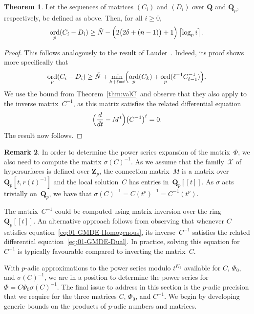 \documentclass[a4paper,11pt]{article}
\numberwithin{equation}{section}
\providecommand{\ceil}[1]{\left\lceil#1\right\rceil}   %
\DeclareMathOperator{\ord}{ord}          %
\theoremstyle{definition}
\newtheorem{thm}{Theorem}[section]
\newtheorem{rem}[thm]{Remark}
\begin{document}
\begin{thm}
Let the sequences of matrices $(C_i)$ and $(D_i)$ over $\mathbf{Q}$ and 
$\mathbf{Q}_p$, respectively, be defined as above.  Then, for all $i \geq 0$, 
\begin{equation*}
\ord_p(C_i - D_i) \geq 
    \tilde{N} - \Bigl(2 \bigl(2 \delta + (n-1)\bigr) + 1\Bigr) \ceil{\log_p i}.
\end{equation*}
\end{thm}

\begin{proof}
This follows analogously to the result of 
Lauder~\citep[Theorem~5.1]{Lauder2006}.  
Indeed, its proof shows more specifically that 
\begin{equation}
\ord_p(C_i - D_i) \geq 
    \tilde{N} + \min_{k+\ell=i} \Bigl(\ord_p(C_k) + 
                                      \ord_p(\ell^{-1} C_{\ell-1}^{-1})\Bigr).
\end{equation}
We use the bound from Theorem~\ref{thm:valC} and observe that they 
also apply to the inverse matrix~$C^{-1}$, as this matrix satisfies 
the related differential equation 
\begin{equation} \label{eq:01-GMDE-Dual}
\Bigl(\frac{d}{dt} - M^t\Bigr) \bigl(C^{-1}\bigr)^t = 0.
\end{equation}
The result now follows.
\end{proof}

\begin{rem}
In order to determine the power series expansion of the matrix~$\Phi$, 
we also need to compute the matrix $\sigma(C)^{-1}$.  As we assume that 
the family~$\mathcal{X}$ of hypersurfaces is defined over $\mathbf{Z}_p$, 
the connection matrix~$M$ is a matrix over $\mathbf{Q}_p[t,r(t)^{-1}]$ 
and the local solution~$C$ has entries in~$\mathbf{Q}_p[[t]]$.  
As $\sigma$ acts trivially on~$\mathbf{Q}_p$, we have that 
$\sigma(C)^{-1} = C(t^p)^{-1} = C^{-1}(t^p)$. 

The matrix~$C^{-1}$ could be computed using matrix inversion 
over the ring $\mathbf{Q}_p[[t]]$.  An alternative approach 
follows from observing that whenever $C$ satisfies 
equation~\eqref{eq:01-GMDE-Homogenous}, its inverse~$C^{-1}$ 
satisfies the related differential equation~\eqref{eq:01-GMDE-Dual}. 
In practice, solving this equation for $C^{-1}$ is typically favourable 
compared to inverting the matrix~$C$.
\end{rem}

With $p$-adic approximations to the power series modulo $t^{K_2}$ available 
for $C$, $\Phi_0$, and $\sigma(C)^{-1}$, we are in a position to determine 
the power series for $\Phi = C \Phi_0 \sigma(C)^{-1}$.  The final issue 
to address in this section is the $p$-adic precision that we require for 
the three matrices $C$, $\Phi_0$, and $C^{-1}$.
We begin by developing generic bounds on the products of $p$-adic numbers 
and matrices.
\end{document}
